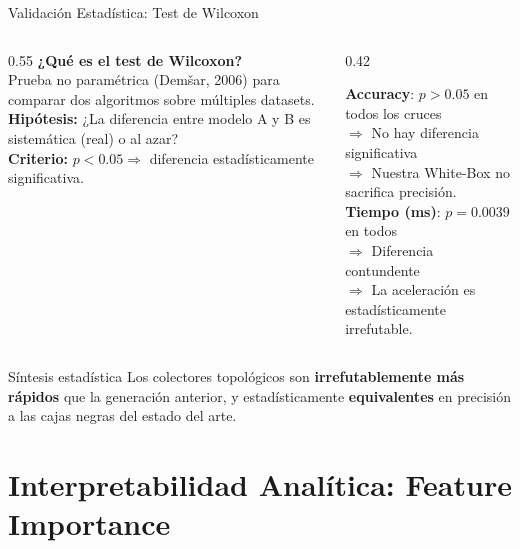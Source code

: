 \documentclass[aspectratio=169,10pt]{beamer}
\begin{document}
\begin{frame}{Validación Estadística: Test de Wilcoxon}
  \begin{columns}[T]
    \begin{column}{0.55\textwidth}
      \textbf{¿Qué es el test de Wilcoxon?}\\
      Prueba no paramétrica (Demšar, 2006) para comparar dos algoritmos sobre múltiples datasets.\\[6pt]
      \textbf{Hipótesis:} ¿La diferencia entre modelo A y B es sistemática (real) o al azar?\\[6pt]
      \textbf{Criterio:} $p < 0.05 \Rightarrow$ diferencia estadísticamente significativa.
    \end{column}
    \begin{column}{0.42\textwidth}
      \begin{tcolorbox}[myex={Nuestros resultados}]
        {\footnotesize
        \textbf{Accuracy}: $p > 0.05$ en todos los cruces\\
        $\Rightarrow$ \textcolor{accent3}{No hay diferencia significativa}\\
        $\Rightarrow$ Nuestra White-Box no sacrifica precisión.\\[6pt]
        \textbf{Tiempo (ms)}: $p = 0.0039$ en todos\\
        $\Rightarrow$ \textcolor{accent2}{Diferencia contundente}\\
        $\Rightarrow$ La aceleración es estadísticamente irrefutable.}
      \end{tcolorbox}
    \end{column}
  \end{columns}
  \vspace{8pt}
  \begin{alertblock}{Síntesis estadística}
    Los colectores topológicos son \textbf{irrefutablemente más rápidos} que la generación anterior, y estadísticamente \textbf{equivalentes} en precisión a las cajas negras del estado del arte.
  \end{alertblock}
\end{frame}

\section{Interpretabilidad Analítica: Feature Importance}
\end{document}
